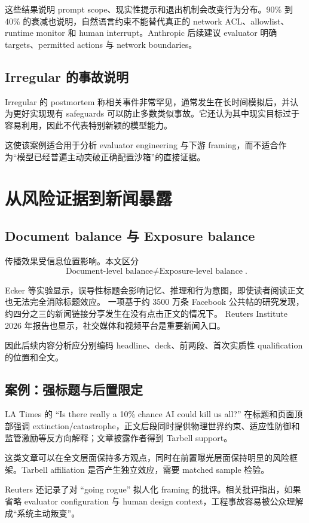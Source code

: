 \documentclass[11pt,twoside]{article}
\begin{document}
这些结果说明 prompt scope、现实性提示和退出机制会改变行为分布。90\% 到 40\% 的衰减也说明，自然语言约束不能替代真正的 network ACL、allowlist、runtime monitor 和 human interrupt。Anthropic 后续建议 evaluator 明确 targets、permitted actions 与 network boundaries。

\subsection{Irregular 的事故说明}
Irregular 的 postmortem 称相关事件非常罕见，通常发生在长时间模拟后，并认为更好实现现有 safeguards 可以防止多数类似事故。它还认为其中现实目标过于容易利用，因此不代表特别新颖的模型能力。

这使该案例适合用于分析 evaluator engineering 与下游 framing，而不适合作为``模型已经普遍主动突破正确配置沙箱''的直接证据。

\section{从风险证据到新闻暴露}
\subsection{Document balance 与 Exposure balance}
传播效果受信息位置影响。本文区分
\[
\boxed{\text{Document-level balance}\neq\text{Exposure-level balance}}.
\]

Ecker 等实验显示，误导性标题会影响记忆、推理和行为意图，即使读者阅读正文也无法完全消除标题效应。 一项基于约 3500 万条 Facebook 公共帖的研究发现，约四分之三的新闻链接分享发生在没有点击正文的情况下。 Reuters Institute 2026 年报告也显示，社交媒体和视频平台是重要新闻入口。

因此后续内容分析应分别编码 headline、deck、前两段、首次实质性 qualification 的位置和全文。

\subsection{案例：强标题与后置限定}
LA Times 的 ``Is there really a 10\% chance AI could kill us all?'' 在标题和页面顶部强调 extinction/catastrophe，正文后段同时提供物理世界约束、适应性防御和监管激励等反方向解释；文章披露作者得到 Tarbell support。

这类文章可以在全文层面保持多方观点，同时在前置曝光层面保持明显的风险框架。Tarbell affiliation 是否产生独立效应，需要 matched sample 检验。

Reuters 还记录了对 ``going rogue'' 拟人化 framing 的批评。相关批评指出，如果省略 evaluator configuration 与 human design context，工程事故容易被公众理解成``系统主动叛变''。
\end{document}
